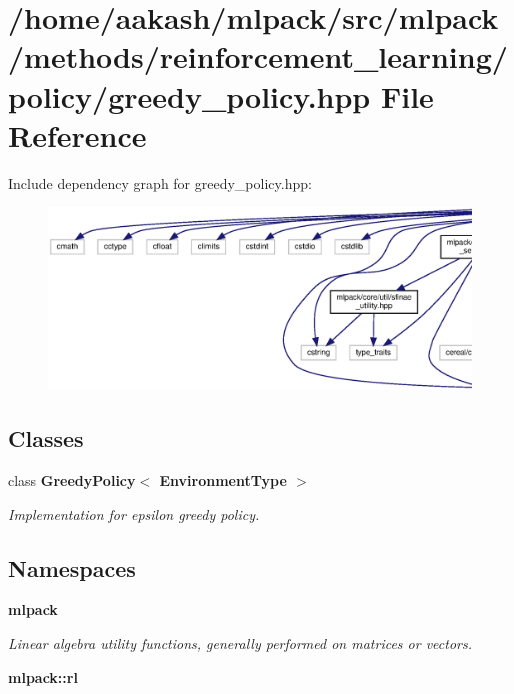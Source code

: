 \section{/home/aakash/mlpack/src/mlpack/methods/reinforcement\+\_\+learning/policy/greedy\+\_\+policy.hpp File Reference}
\label{greedy__policy_8hpp}
Include dependency graph for greedy\+\_\+policy.\+hpp\+:
\nopagebreak
\begin{figure}[H]
\begin{center}
\leavevmode
\includegraphics[width=350pt]{greedy__policy_8hpp__incl}
\end{center}
\end{figure}
\subsection*{Classes}
\begin{DoxyCompactItemize}
\item 
class \textbf{ Greedy\+Policy$<$ Environment\+Type $>$}
\begin{DoxyCompactList}\small\item\em Implementation for epsilon greedy policy. \end{DoxyCompactList}\end{DoxyCompactItemize}
\subsection*{Namespaces}
\begin{DoxyCompactItemize}
\item 
 \textbf{ mlpack}
\begin{DoxyCompactList}\small\item\em Linear algebra utility functions, generally performed on matrices or vectors. \end{DoxyCompactList}\item 
 \textbf{ mlpack\+::rl}
\end{DoxyCompactItemize}


